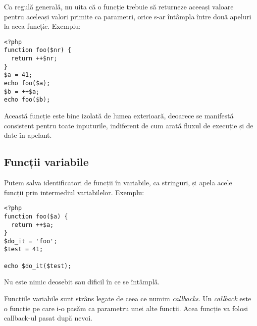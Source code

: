 Ca regulă generală, nu uita că o funcție trebuie să returneze aceeași valoare
pentru aceleași valori primite ca parametri, orice s-ar întâmpla între două
apeluri la acea funcție. Exemplu:
\begin{lstlisting}
<?php
function foo($nr) {
  return ++$nr;
}
$a = 41;
echo foo($a);
$b = ++$a;
echo foo($b);
\end{lstlisting}
Această funcție este bine izolată de lumea exterioară, deoarece se manifestă
consistent pentru toate inputurile, indiferent de cum arată fluxul de execuție
și de date în apelant.



\subsection{Funcții variabile}
Putem salva identificatori de funcții în variabile, ca stringuri, și apela 
acele funcții prin intermediul variabilelor. Exemplu:
\begin{lstlisting}
<?php
function foo($a) {
  return ++$a;
}
$do_it = 'foo';
$test = 41;

echo $do_it($test);
\end{lstlisting}
Nu este nimic deosebit sau dificil în ce se întâmplă.


Funcțiile variabile sunt strâns legate de ceea ce numim \textsl{callbacks}.
Un \textit{callback} este o funcție pe care i-o pasăm ca parametru
unei alte funcții. Acea funcție va folosi callback-ul pasat după nevoi.

